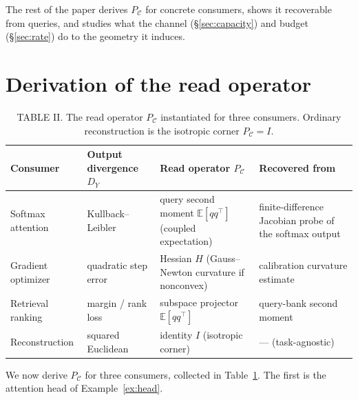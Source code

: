 \documentclass[lettersize,onecolumn]{IEEEtran}
\theoremstyle{definition}
\theoremstyle{remark}
\newcommand{\PC}{P_{\mathcal{C}}}
\newcommand{\E}{\mathbb{E}}
\begin{document}
The rest of the paper derives $\PC$ for concrete consumers, shows it recoverable
from queries, and studies what the channel (\S\ref{sec:capacity}) and budget
(\S\ref{sec:rate}) do to the geometry it induces.

\section{Derivation of the read operator}\label{sec:readop}

\begin{table}[!t]
\centering
\footnotesize
\caption{TABLE II. The read operator $\PC$ instantiated for three consumers. Ordinary
reconstruction is the isotropic corner $\PC=I$.}
\label{tab:readops}
\setlength{\tabcolsep}{6pt}\renewcommand{\arraystretch}{1.3}
\begin{tabular}{@{}p{2.0cm}p{2.3cm}p{4.3cm}p{4.1cm}@{}}
\toprule
\textbf{Consumer} & \textbf{Output divergence $D_Y$} & \textbf{Read operator $\PC$} & \textbf{Recovered from} \\
\midrule
Softmax attention & Kullback--Leibler & query second moment $\E[qq^\top]$ (coupled expectation) & finite-difference Jacobian probe of the softmax output \\
Gradient optimizer & quadratic step error & Hessian $H$ (Gauss--Newton curvature if nonconvex) & calibration curvature estimate \\
Retrieval ranking & margin / rank loss & subspace projector $\E[qq^\top]$ & query-bank second moment \\
Reconstruction & squared Euclidean & identity $I$ (isotropic corner) & --- (task-agnostic) \\
\bottomrule
\end{tabular}
\end{table}

We now derive $\PC$ for three consumers, collected in Table~\ref{tab:readops}. The
first is the attention head of Example~\ref{ex:head}.
\end{document}
